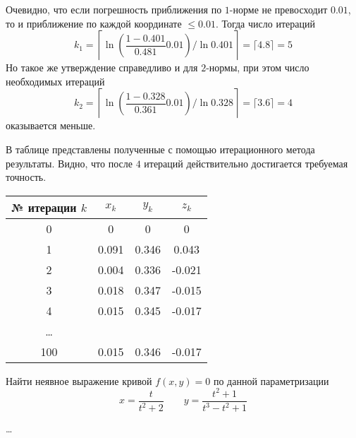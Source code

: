 Очевидно, что если погрешность приближения по $1$-норме не превосходит $0.01$,
то и приближение по каждой координате $\leq 0.01$. Тогда число итераций
\begin{equation*}
    k_1 =  \left\lceil \ln \left(\frac{1 - 0.401}{0.481} 0.01\right)
                       / \ln{0.401} \right \rceil
        = \lceil 4.8 \rceil = 5
\end{equation*}
Но такое же утверждение справедливо и для $2$-нормы, при этом число необходимых
итераций
\begin{equation*}
    k_2 =  \left\lceil \ln \left(\frac{1 - 0.328}{0.361} 0.01\right)
                       / \ln{0.328} \right \rceil
        = \lceil 3.6 \rceil = 4
\end{equation*}
оказывается меньше.

В таблице представлены полученные с помощью итерационного метода результаты.
Видно, что после $4$ итераций действительно достигается требуемая точность.
\begin{center}
\begin{tabular}{c|c|c|c}
    № итерации $k$ & $x_k$ & $y_k$ & $z_k$\\
    \hline
    0 & 0 & 0 & 0 \\ \hline
    1 & 0.091 & 0.346 & 0.043 \\ \hline
    2 & 0.004 & 0.336 & -0.021 \\ \hline
    3 & 0.018 & 0.347 & -0.015 \\ \hline
    4 & 0.015 & 0.345 & -0.017 \\ \hline
    \ldots & & & \\ \hline
    100 &  0.015 & 0.346 & -0.017\\
\end{tabular}
\end{center}


\begin{problem}
    Найти неявное выражение кривой $f(x, y) = 0$ по данной параметризации
    \begin{equation*}
        x = \frac{t}{t^2 + 2}
        \qquad
        y = \frac{t^2 + 1}{t^3 - t^2 + 1}
    \end{equation*}
\end{problem}

\ldots